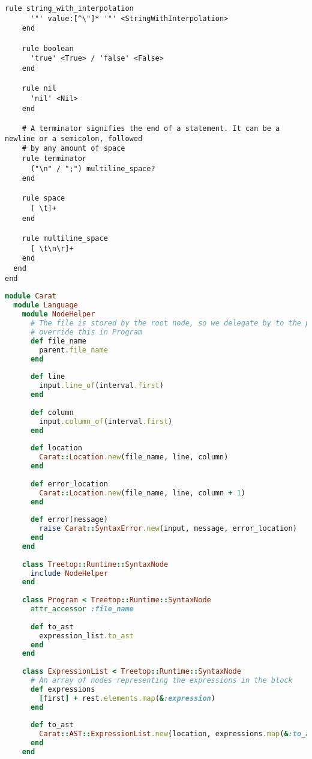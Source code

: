 \begin{lstlisting}[title={\small\ttfamily\bfseries parser/language.treetop},language=treetop]
    rule string_with_interpolation
      '"' value:[^\"]* '"' <StringWithInterpolation>
    end
    
    rule boolean
      'true' <True> / 'false' <False>
    end
    
    rule nil
      'nil' <Nil>
    end
    
    # A terminator signifies the end of a statement. It can be a newline or a semicolon, followed
    # by any amount of space
    rule terminator
      ("\n" / ";") multiline_space?
    end
    
    rule space
      [ \t]+
    end
    
    rule multiline_space
      [ \t\n\r]+
    end
  end
end

\end{lstlisting}
\begin{lstlisting}[title={\small\ttfamily\bfseries parser/nodes.rb},language=Ruby]
module Carat
  module Language
    module NodeHelper
      # The file is stored by the root node, so we delegate by to the parent by default and then
      # override this in Program
      def file_name
        parent.file_name
      end
      
      def line
        input.line_of(interval.first)
      end
      
      def column
        input.column_of(interval.first)
      end
      
      def location
        Carat::Location.new(file_name, line, column)
      end
      
      def error_location
        Carat::Location.new(file_name, line, column + 1)
      end
      
      def error(message)
        raise Carat::SyntaxError.new(input, message, error_location)
      end
    end
    
    class Treetop::Runtime::SyntaxNode
      include NodeHelper
    end
    
    class Program < Treetop::Runtime::SyntaxNode
      attr_accessor :file_name
      
      def to_ast
        expression_list.to_ast
      end
    end
  
    class ExpressionList < Treetop::Runtime::SyntaxNode
      # An array of nodes representing the expressions in the block
      def expressions
        [first] + rest.elements.map(&:expression)
      end
      
      def to_ast
        Carat::AST::ExpressionList.new(location, expressions.map(&:to_ast).compact)
      end
    end
    

\end{lstlisting}

